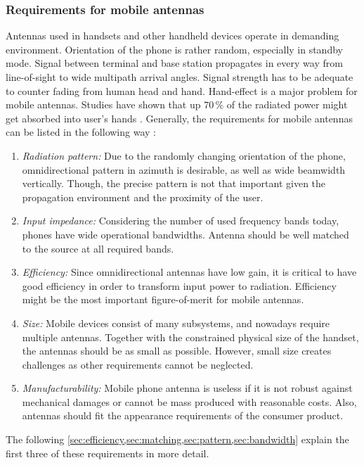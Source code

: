 \subsubsection{Requirements for mobile antennas}
\label{sec:requirements}
Antennas used in handsets and other handheld devices operate in demanding environment. Orientation of the phone is rather random, especially in standby mode. Signal between terminal and base station propagates in every way from line-of-sight to wide multipath arrival angles. Signal strength has to be adequate to counter fading from human head and hand. Hand-effect is a major problem for mobile antennas. Studies have shown that up $70\,\%$ of the radiated power might get absorbed into user's hands \cite{valkonen_phd}. Generally, the requirements for mobile antennas can be listed in the following way \cite{saunders, lehtovuori_phd}:
\begin{enumerate}
    \item \textit{Radiation pattern:} Due to the randomly changing orientation of the phone, omnidirectional pattern in azimuth is desirable, as well as wide beamwidth vertically. Though, the precise pattern is not that important given the propagation environment and the proximity of the user.
    \item \textit{Input impedance:} Considering the number of used frequency bands today, phones have wide operational bandwidths. Antenna should be well matched to the source at all required bands.
    \item \textit{Efficiency:} Since omnidirectional antennas have low gain, it is critical to have good efficiency in order to transform input power to radiation. Efficiency might be the most important figure-of-merit for mobile antennas.
    \item \textit{Size:} Mobile devices consist of many subsystems, and nowadays require multiple antennas. Together with the constrained physical size of the handset, the antennas should be as small as possible. However, small size creates challenges as other requirements cannot be neglected.
    \item \textit{Manufacturability:} Mobile phone antenna is useless if it is not robust against mechanical damages or cannot be mass produced with reasonable costs. Also, antennas should fit the appearance requirements of the consumer product. 
\end{enumerate}

The following \cref{sec:efficiency,sec:matching,sec:pattern,sec:bandwidth} explain the first three of these requirements in more detail.

